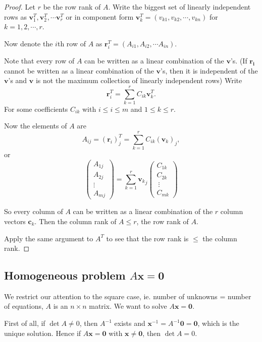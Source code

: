 \documentclass[a4paper]{article}
\begin{document}
\begin{proof}
  Let $r$ be the row rank of $A$. Write the biggest set of linearly independent rows as $\mathbf{v}_1^T, \mathbf{v}_2^T, \cdots \mathbf{v}_r^T$ or in component form $\mathbf{v}_k^T = (v_{k1}, v_{k2}, \cdots, v_{kn})$ for $k = 1, 2, \cdots, r$.

  Now denote the $i$th row of $A$ as $\mathbf{r}_i^T = (A_{i1}, A_{i2}, \cdots A_{in})$.

  Note that every row of $A$ can be written as a linear combination of the $\mathbf{v}$'s. (If $\mathbf{r_i}$ cannot be written as a linear combination of the $\mathbf{v}$'s, then it is independent of the $\mathbf{v}$'s and $\mathbf{v}$ is not the maximum collection of linearly independent rows) Write
  \[
    \mathbf{r}_i^T = \sum_{k = 1}^r C_{ik}\mathbf{v}_{k}^T.
  \]
  For some coefficients $C_{ik}$ with $i \leq i\leq m$ and $1 \leq k \leq r$.

  Now the elements of $A$ are
  \[
    A_{ij} = (\mathbf{r}_i)^T_j = \sum_{k = 1}^r C_{ik}(\mathbf{v}_k)_j,
  \]
  or
  \[
    \begin{pmatrix}
      A_{1j}\\
      A_{2j}\\
      \vdots\\
      A_{mj}
    \end{pmatrix} = \sum_{k = 1}^r {\mathbf{v}_k}_j
    \begin{pmatrix}
      C_{1k}\\
      C_{2k}\\\
      \vdots\\
      C_{mk}
    \end{pmatrix}
  \]

  So every column of $A$ can be written as a linear combination of the $r$ column vectors $\mathbf{c}_k$. Then the column rank of $A \leq r$, the row rank of $A$.

  Apply the same argument to $A^T$ to see that the row rank is $\leq$ the column rank.
\end{proof}

\subsection{Homogeneous problem \texorpdfstring{$A\mathbf{x} = \mathbf{0}$}{Ax = 0}}
We restrict our attention to the square case, ie. number of unknowns = number of equations, $A$ is an $n\times n$ matrix. We want to solve $A\mathbf{x} = \mathbf{0}$.

First of all, if $\det A\not=0$, then $A^{-1}$ exists and $\mathbf{x}^{-1} = A^{-1}\mathbf{0} = \mathbf{0}$, which is the unique solution. Hence if $A\mathbf{x} = \mathbf{0}$ with $\mathbf{x} \not= \mathbf{0}$, then $\det A = 0$.
\end{document}
